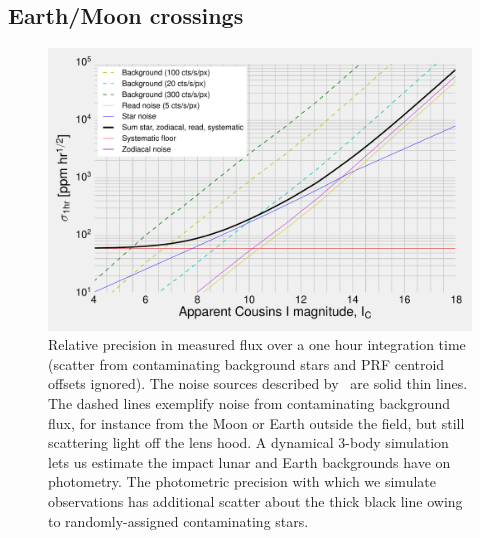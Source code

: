 \subsection{Earth/Moon crossings}
\label{sec:earth_moon_crossings}
\begin{figure}[!th]
	\centering
	\includegraphics{figures/precision_memo.pdf}
	\caption{Relative precision in measured flux over a one hour integration time (scatter from contaminating background stars and PRF centroid offsets ignored). The noise sources described by~\citet{Sullivan_2015} are solid thin lines. The dashed lines exemplify noise from contaminating background flux, for instance from the Moon or Earth outside the \tess field, but still scattering light off  the \tess lens hood. A dynamical 3-body simulation lets us estimate the impact  lunar and Earth backgrounds have on \tesss photometry.
	The photometric precision with which we simulate observations has additional scatter about the thick black line owing to randomly-assigned contaminating stars.}
	\label{fig:noise_with_moon}
\end{figure}

